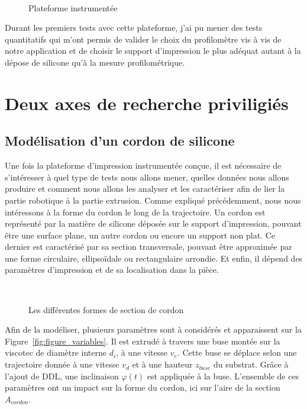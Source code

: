 \documentclass[11pt,a4paper]{article}
\begin{document}
        
        \begin{figure}[H]
            \centering
            \def\svgwidth{0.8\columnwidth}
            \caption{Plateforme instrumentée}~\label{fig:laser_structure}
        \end{figure}
        

        Durant les premiers tests avec cette plateforme, j'ai pu mener des tests quantitatifs qui m'ont permis de valider le choix du profilomètre vis à vis de notre application et de choisir le support d'impression le plus adéquat autant à la dépose de silicone qu'à la mesure profilométrique. 


\section*{Deux axes de recherche priviligiés}

    \subsection{Modélisation d'un cordon de silicone}
        Une fois la plateforme d'impression instrumentée conçue, il est nécessaire de s'intéresser à quel type de tests nous allons mener, quelles données nous allons produire et comment nous allons les analyser et les caractériser afin de lier la partie robotique à la partie extrusion. 
        Comme expliqué précédemment, nous nous intéressons à la forme du cordon le long de la trajectoire. 
        Un cordon est représenté par la matière de silicone déposée sur le support d'impression, pouvant être une surface plane, un autre cordon ou encore un support non plat. Ce dernier est caractérisé par sa section transversale, pouvant être approximée par une forme circulaire, ellipsoïdale ou rectangulaire arrondie. Et enfin, il dépend des paramètres d'impression et de sa localisation dans la pièce. 

        \begin{figure}[H]
            \centering
            \def\svgwidth{0.75\columnwidth}
            \caption{Les différentes formes de section de cordon}~\label{fig:forme_cordon}
        \end{figure}

        Afin de la modéliser, plusieurs paramètres sont à considérés et apparaissent sur la Figure~\ref{fig:figure_variables}. Il est extrudé à travers une buse montée sur la viscotec de diamètre interne $d_i$, à une vitesse $v_e$. Cette buse se déplace selon une trajectoire donnée à une vitesse $v_d$ et à une hauteur $z_{buse}$ du substrat. Grâce à l'ajout de DDL, une inclinaison $\varphi(t)$ est appliquée à la buse. L'ensemble de ces paramètres ont un impact sur la forme du cordon, ici sur l'aire de la section $A_{cordon}$. 
        
\end{document}
